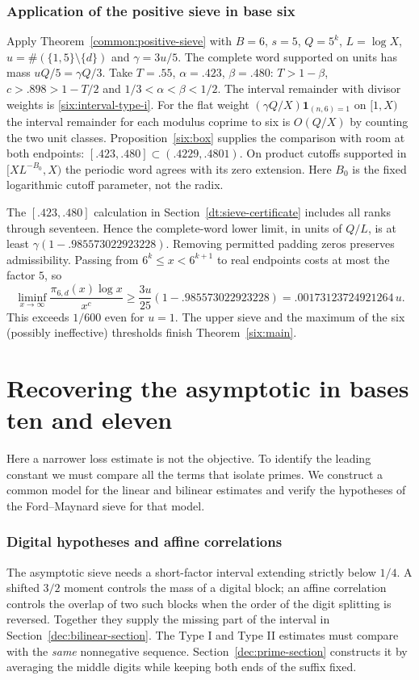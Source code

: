 \documentclass[11pt,a4paper]{article}
\theoremstyle{paperplain}
\numberwithin{equation}{section}
\newcommand{\ind}{\mathbf1}
\begin{document}
\section{Application of the positive sieve in base six}\label{six:positive}
Apply Theorem~\ref{common:positive-sieve} with $B=6$, $s=5$,
$Q=5^k$, $L=\log X$, $u=\#(\{1,5\}\setminus\{d\})$ and
$\gamma=3u/5$. The complete word supported on units has mass
$uQ/5=\gamma Q/3$. Take $T=.55$, $\alpha=.423$, $\beta=.480$:
$T>1-\beta$, $c>.898>1-T/2$ and $1/3<\alpha<\beta<1/2$.
The interval remainder with divisor weights is \eqref{six:interval-type-i}.
For the flat weight $(\gamma Q/X)\ind_{(n,6)=1}$ on $[1,X)$ the
interval remainder for each modulus coprime to six is $O(Q/X)$ by
counting the two unit classes. Proposition~\ref{six:box} supplies the
comparison with room at both endpoints: $[.423,.480]\subset(.4229,.4801)$.
On product cutoffs supported in $[X L^{-B_0},X)$ the periodic word agrees
with its zero extension. Here $B_0$ is the fixed logarithmic cutoff
parameter, not the radix.

The $[.423,.480]$ calculation in Section~\ref{dt:sieve-certificate}
includes all ranks through seventeen. Hence the complete-word lower limit, in units of $Q/L$, is at least
$\gamma(1-.985573022923228)$. Removing permitted padding zeros
preserves admissibility. Passing from $6^k\le x<6^{k+1}$ to real
endpoints costs at most the factor $5$, so
\[
 \liminf_{x\to\infty}\frac{\pi_{6,d}(x)\log x}{x^c}
 \ge \frac{3u}{25}(1-.985573022923228)=.00173123724921264\,u.
\]
This exceeds $1/600$ even for $u=1$. The upper sieve and the maximum
of the six (possibly ineffective) thresholds finish Theorem~\ref{six:main}.

\clearpage
\part{Recovering the asymptotic in bases ten and eleven}\label{part:exact}
Here a narrower loss estimate is not the objective. To identify the
leading constant we must compare all the terms that isolate primes.
We construct a common model for the linear and bilinear estimates and
verify the hypotheses of the Ford--Maynard sieve for that model.

\section{Digital hypotheses and affine correlations}
\label{dec:section}

The asymptotic sieve needs a short-factor interval extending strictly
below $1/4$. A shifted $3/2$ moment controls the mass of a digital block;
an affine correlation controls the overlap of two such blocks when the
order of the digit splitting is reversed. Together they supply the missing
part of the interval in Section~\ref{dec:bilinear-section}. The Type I
and Type II estimates must compare with the \emph{same} nonnegative
sequence. Section~\ref{dec:prime-section} constructs it by averaging the
middle digits while keeping both ends of the suffix fixed.
\end{document}
